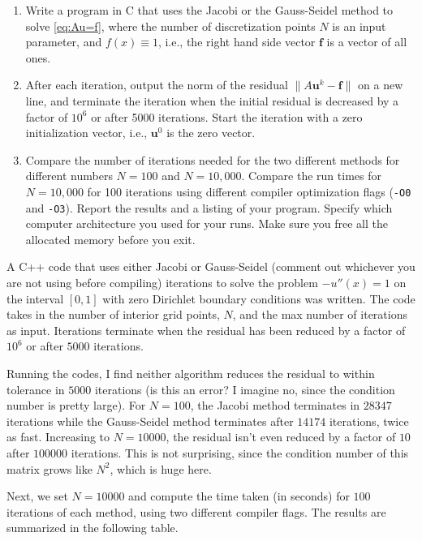 \documentclass[11pt]{article}
\newcommand{\bs}{\boldsymbol}
\begin{document}
\begin{enumerate}
  \begin{enumerate}
  \item Write a program in C that uses the Jacobi or the Gauss-Seidel
    method to solve \eqref{eq:Au=f}, where the number of
    discretization points $N$ is an input parameter, and $f(x)\equiv
    1$, i.e., the right hand side vector $\bs f$ is a vector of all
    ones.
  \item After each iteration, output the norm of the residual $\|A\bs
    u^k - \bs f\|$ on a new line, and terminate the iteration when the
    initial residual is decreased by a factor of $10^6$ or after 5000
    iterations. Start the iteration with a zero initialization vector,
    i.e., $\bs u^0$ is the zero vector.
  \item Compare the number of iterations needed for the two different
    methods for different numbers $N=100$ and $N=10,000$. Compare the
    run times for $N=10,000$ for 100 iterations using different
    compiler optimization flags (\texttt{-O0} and
    \texttt{-O3}). Report the results and a listing of your
    program. Specify which computer architecture you used for your
    runs.  Make sure you free all the allocated memory before you
    exit.
  \end{enumerate}


 A C++ code that uses either Jacobi or Gauss-Seidel (comment out whichever you are not using before compiling) iterations to solve the problem $-u''(x)=1$ on the interval $[0,1]$ with zero Dirichlet boundary conditions was written. The code takes in the number of interior grid points, $N$, and the max number of iterations as input. Iterations terminate when the residual has been reduced by a factor of $10^6$ or after $5000$ iterations.

Running the codes, I find neither algorithm reduces the residual to within tolerance in $5000$ iterations (is this an error? I imagine no, since the condition number is pretty large). For $N=100$, the Jacobi method terminates in $28347$ iterations while the Gauss-Seidel method terminates after $14174$ iterations, twice as fast. Increasing to $N=10000$, the residual isn't even reduced by a factor of $10$ after $100000$ iterations. This is not surprising, since the condition number of this matrix grows like $N^2$, which is huge here. 

Next, we set $N=10000$ and compute the time taken (in seconds) for $100$ iterations of each method, using two different compiler flags. The results are summarized in the following table. 


\end{enumerate}
\end{document}
